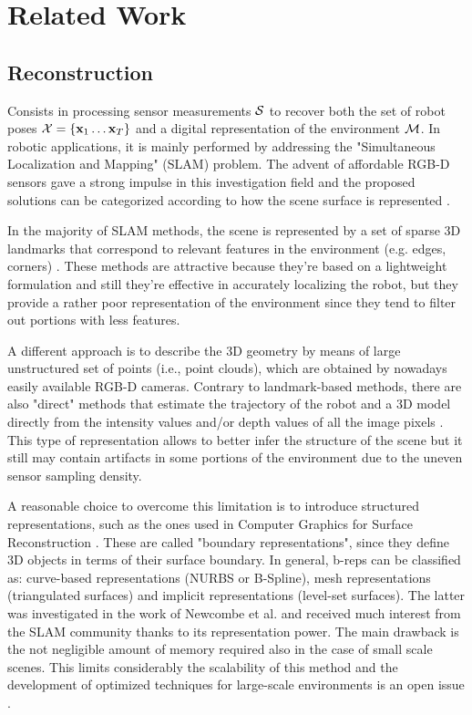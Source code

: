 \documentclass[conference]{IEEEtran}
\begin{document}
\section{Related Work}

\subsection{Reconstruction}

Consists in processing sensor measurements $\mathcal{S}$ to recover both the
set of robot poses $\mathcal{X} = \{ \mathbf{x}_1 \dots \mathbf{x}_T \}$ and a digital
representation of the environment $\mathcal{M}$. In robotic applications, it
is mainly performed by addressing the "Simultaneous Localization and
Mapping" (SLAM) problem. The advent of affordable RGB-D sensors gave a
strong impulse in this investigation field and the proposed solutions
can be categorized according to how the scene surface is represented
\cite{cadena2016ieeetransrob}.

In the majority of SLAM methods, the scene is represented by a set of
sparse 3D landmarks that correspond to relevant features in the
environment (e.g. edges, corners) \cite{mur2015ieeetransrob}. These
methods are attractive because they're based on a lightweight
formulation and still they're effective in accurately localizing the
robot, but they provide a rather poor representation of the
environment since they tend to filter out portions with less features.

A different approach is to describe the 3D geometry by means of large
unstructured set of points (i.e., point clouds), which are obtained by
nowadays easily available RGB-D cameras. Contrary to landmark-based
methods, there are also "direct" methods that estimate the trajectory
of the robot and a 3D model directly from the intensity values and/or
depth values of all the image pixels
\cite{newcombe2011ICCV,steinbrucker2011real}. This type of
representation allows to better infer the structure of the scene but
it still may contain artifacts in some portions of the environment due
to the uneven sensor sampling density.

A reasonable choice to overcome this limitation is to introduce
structured representations, such as the ones used in Computer Graphics
for Surface Reconstruction \cite{berger2014state}. These are called
"boundary representations", since they define 3D objects in terms of
their surface boundary. In general, b-reps can be classified as:
curve-based representations (NURBS or B-Spline), mesh representations
(triangulated surfaces) and implicit representations (level-set
surfaces). The latter was investigated in the work of Newcombe et
al. \cite{newcombe2011kinectfusion} and received much interest from
the SLAM community thanks to its representation power. The main
drawback is the not negligible amount of memory required also in the
case of small scale scenes. This limits considerably the scalability
of this method and the development of optimized techniques for
large-scale environments is an open issue
\cite{kahler2015very,vespa2018efficient}.
\end{document}
